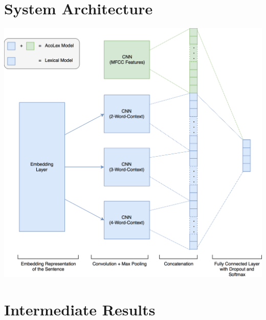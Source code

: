\documentclass[a0,landscape]{a0poster}
\begin{document}
\begin{multicols}{3}

\section*{System Architecture}
\begin{center}
	\includegraphics[width=0.9\linewidth]{Bilder/CNN_Diagram.png}
\end{center}



\color{Black} %
\large

\section*{Intermediate Results}
\begin{center}
	\begin{tabular}{c | c |c | c | c | c | c | c }
		

\end{tabular}
\end{center}
\end{multicols}
\end{document}
